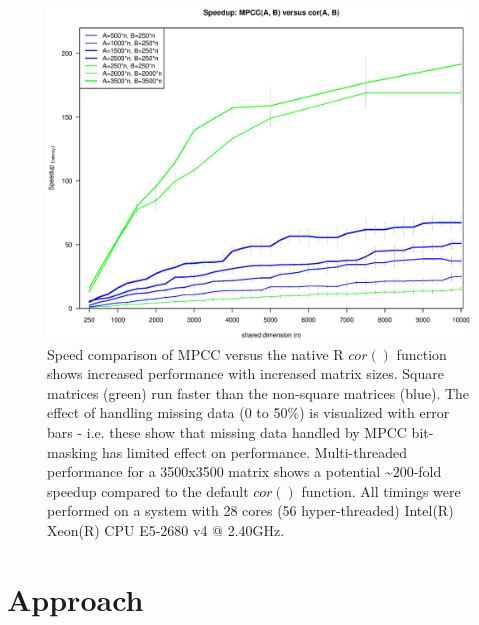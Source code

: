 \documentclass{bioinfo}
\begin{document}
\begin{figure}[H]
\centering
\includegraphics[width=\linewidth]{img/figure02new.eps}
  \caption{ \small Speed comparison of MPCC versus the native R $cor()$
  function shows increased performance with increased matrix
  sizes. Square matrices (green) run faster than the non-square
  matrices (blue).  The effect of handling missing data (0 to 50\%) is
  visualized with error bars - i.e. these show that missing data
  handled by MPCC bit-masking has limited effect on performance.
  Multi-threaded performance for a 3500x3500 matrix shows a potential
   \textasciitilde{}$200$-fold speedup compared to the default $cor()$ function.  All
  timings were performed on a system with 28 cores (56 hyper-threaded)
  Intel(R) Xeon(R) CPU E5-2680 v4 @ 2.40GHz.  } \label{fig:fig2}
\end{figure}

\vspace*{-10mm}


\section{Approach}
\end{document}
